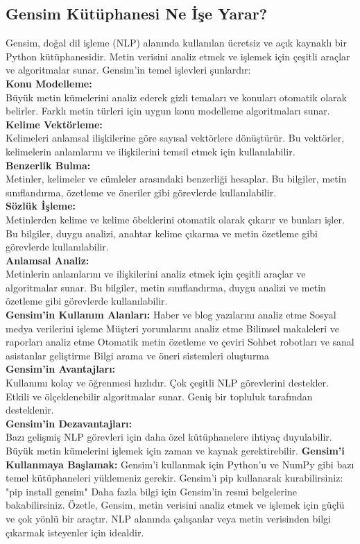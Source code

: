 \documentclass[12pt, a4paper]{article}
\begin{document}
	\subsection{Gensim Kütüphanesi Ne İşe Yarar?}
	Gensim, doğal dil işleme (NLP) alanında kullanılan ücretsiz ve açık kaynaklı bir Python kütüphanesidir. Metin verisini analiz etmek ve işlemek için çeşitli araçlar ve algoritmalar sunar. Gensim'in temel işlevleri şunlardır:\\
	\textbf{Konu Modelleme:}\\
	Büyük metin kümelerini analiz ederek gizli temaları ve konuları otomatik olarak belirler.
	Farklı metin türleri için uygun konu modelleme algoritmaları sunar.\\
	\textbf{Kelime Vektörleme:}\\
	Kelimeleri anlamsal ilişkilerine göre sayısal vektörlere dönüştürür.
	Bu vektörler, kelimelerin anlamlarını ve ilişkilerini temsil etmek için kullanılabilir.\\
	\textbf{Benzerlik Bulma:}\\
	Metinler, kelimeler ve cümleler arasındaki benzerliği hesaplar.
	Bu bilgiler, metin sınıflandırma, özetleme ve öneriler gibi görevlerde kullanılabilir.\\
	\textbf{Sözlük İşleme:}\\
	Metinlerden kelime ve kelime öbeklerini otomatik olarak çıkarır ve bunları işler.
	Bu bilgiler, duygu analizi, anahtar kelime çıkarma ve metin özetleme gibi görevlerde kullanılabilir.\\
	\textbf{Anlamsal Analiz:}\\
	Metinlerin anlamlarını ve ilişkilerini analiz etmek için çeşitli araçlar ve algoritmalar sunar.
	Bu bilgiler, metin sınıflandırma, duygu analizi ve metin özetleme gibi görevlerde kullanılabilir.\\
	\textbf{Gensim'in Kullanım Alanları:}
	Haber ve blog yazılarını analiz etme
	Sosyal medya verilerini işleme
	Müşteri yorumlarını analiz etme
	Bilimsel makaleleri ve raporları analiz etme
	Otomatik metin özetleme ve çeviri
	Sohbet robotları ve sanal asistanlar geliştirme
	Bilgi arama ve öneri sistemleri oluşturma\\
	\textbf{Gensim'in Avantajları:}\\
	Kullanımı kolay ve öğrenmesi hızlıdır.
	Çok çeşitli NLP görevlerini destekler.
	Etkili ve ölçeklenebilir algoritmalar sunar.
	Geniş bir topluluk tarafından desteklenir.\\
	\textbf{Gensim'in Dezavantajları:}\\
	Bazı gelişmiş NLP görevleri için daha özel kütüphanelere ihtiyaç duyulabilir.
	Büyük metin kümelerini işlemek için zaman ve kaynak gerektirebilir.
	\textbf{Gensim'i Kullanmaya Başlamak:}
	Gensim'i kullanmak için Python'u ve NumPy gibi bazı temel kütüphaneleri yüklemeniz gerekir. Gensim'i pip kullanarak kurabilirsiniz:
	"pip install gensim"
	Daha fazla bilgi için Gensim'in resmi belgelerine bakabilirsiniz\cite{gensim}.
	Özetle, Gensim, metin verisini analiz etmek ve işlemek için güçlü ve çok yönlü bir araçtır. NLP alanında çalışanlar veya metin verisinden bilgi çıkarmak isteyenler için idealdir.
\end{document}
